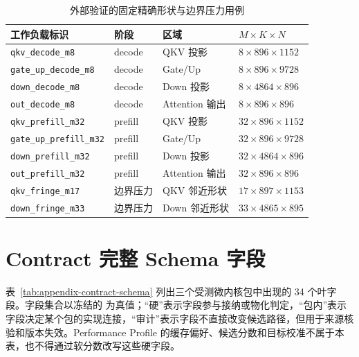 \begin{thesisappendix}
\begin{table}[!htbp]
  \centering
  \caption{外部验证的固定精确形状与边界压力用例}
  \label{tab:appendix-external-workloads}
  \begin{tabularx}{\textwidth}{
    @{}
    >{\raggedright\arraybackslash}p{}
    >{\centering\arraybackslash}p{}
    >{\raggedright\arraybackslash}p{}
    >{\centering\arraybackslash}X
    @{}
  }
    \toprule
    \textbf{工作负载标识} & \textbf{阶段} & \textbf{区域} &
    \textbf{$M\times K\times N$} \\
    \midrule
    \texttt{qkv\_decode\_m8} & decode & QKV 投影 & $8\times896\times1152$ \\
    \texttt{gate\_up\_decode\_m8} & decode & Gate/Up & $8\times896\times9728$ \\
    \texttt{down\_decode\_m8} & decode & Down 投影 & $8\times4864\times896$ \\
    \texttt{out\_decode\_m8} & decode & Attention 输出 & $8\times896\times896$ \\
    \texttt{qkv\_prefill\_m32} & prefill & QKV 投影 & $32\times896\times1152$ \\
    \texttt{gate\_up\_prefill\_m32} & prefill & Gate/Up & $32\times896\times9728$ \\
    \texttt{down\_prefill\_m32} & prefill & Down 投影 & $32\times4864\times896$ \\
    \texttt{out\_prefill\_m32} & prefill & Attention 输出 & $32\times896\times896$ \\
    \texttt{qkv\_fringe\_m17} & 边界压力 & QKV 邻近形状 & $17\times897\times1153$ \\
    \texttt{down\_fringe\_m33} & 边界压力 & Down 邻近形状 & $33\times4865\times895$ \\
    \bottomrule
  \end{tabularx}
\end{table}

\section{Contract 完整 Schema 字段}
\label{sec:appendix-contract-schema}

表~\ref{tab:appendix-contract-schema} 列出三个受测微内核包中出现的 34 个叶字段。字段集合以冻结的  为真值；“硬”表示字段参与接纳或物化判定，“包内”表示字段决定某个包的实现连接，“审计”表示字段不直接改变候选路径，但用于来源核验和版本失效。Performance Profile 的缓存偏好、候选分数和目标校准不属于本表，也不得通过软分数改写这些硬字段。


\end{thesisappendix}
